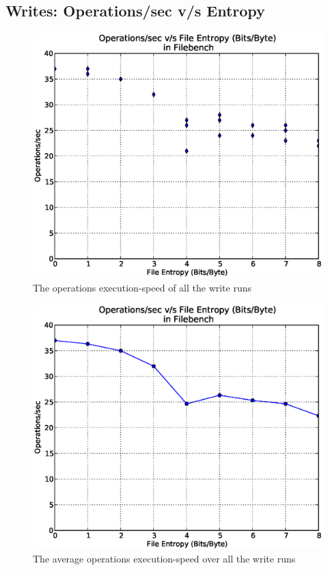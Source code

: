 \subsection{Writes: Operations/sec v/s Entropy}
\begin{figure}[H]
\begin{center}
\includegraphics[scale=.55]{../results/set1/write_ops_all.eps}
\caption{The operations execution-speed of all the write runs}
\label{fig:wops}
\end{center}
\end{figure}

\begin{figure}[H]
\begin{center}
\includegraphics[scale=.55]{../results/set1/write_ops_avg.eps}
\caption{The average operations execution-speed over all the write runs}
\label{fig:wopsavg}
\end{center}
\end{figure}

